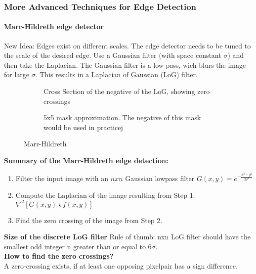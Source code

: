 \subsubsection{More Advanced Techniques for Edge Detection}
\paragraph{Marr-Hildreth edge detector}
New Idea: Edges exist on different scales. The edge detector needs to be tuned to the scale of the desired edge. Use a Gaussian filter (with space constant $\sigma$) and then take the Laplacian. The Gaussian filter is a low pass, wich blurs the image for large $\sigma$. This results in a Laplacian of Gaussian (LoG) filter.
\begin{figure}[h]
	\centering
	\begin{subfigure}[b]{0.45\textwidth}
		\centering
		\caption{Cross Section of the negative of the LoG, showing zero crossings}
	\end{subfigure}
	\begin{subfigure}[b]{0.45\textwidth}
		\centering
		\caption{5x5 mask approximation. The negative of this mask would be used in practicej}
	\end{subfigure}
	\caption{Marr-Hildreth}
\end{figure}

\textbf{Summary of the Marr-Hildreth edge detection:}
\begin{enumerate}
\item Filter the input image with an $n x n$ Gaussian lowpass filter $G(x,y)=e^{-\frac{x^2+y^2}{2\sigma^2}}$
\item Compute the Laplacian of the image resulting from Step 1. $\nabla ^2[G(x,y) \star f(x,y)]$
\item Find the zero crossing of the image from Step 2.
\end{enumerate}
\textbf{Size of the discrete LoG filter}
Rule of thumb: nxn LoG filter should have the smallest odd integer n greater than or equal to $6\sigma$.\\
\textbf{How to find the zero crossings?}\\
A zero-crossing exists, if at least one opposing pixelpair has a sign difference.

